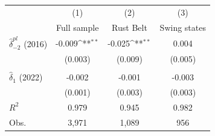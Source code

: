 {
\def\sym#1{\ifmmode^{#1}\else\(^{#1}\)\fi}
\begin{tabular}{l*{3}{c}}
\toprule
                         &\multicolumn{1}{c}{(1)}         &\multicolumn{1}{c}{(2)}         &\multicolumn{1}{c}{(3)}         \\
                         & Full sample         &   Rust Belt         &Swing states         \\
\midrule
$\hat{\delta}_{-2}^{pl}$ (2016)&      -0.009\sym{**} &      -0.025\sym{**} &       0.004         \\
                         &     (0.003)         &     (0.009)         &     (0.005)         \\
\addlinespace
\addlinespace            &                     &                     &                     \\
\addlinespace
$\hat{\delta}_{1}$ (2022)&      -0.002         &      -0.001         &      -0.003         \\
                         &     (0.001)         &     (0.003)         &     (0.003)         \\
\midrule
\(R^{2}\)                &       0.979         &       0.945         &       0.982         \\
Obs.                     &       3,971         &       1,089         &         956         \\
\bottomrule
\end{tabular}
}
